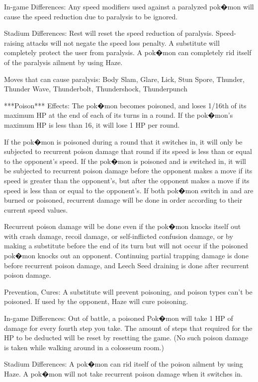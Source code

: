 \documentclass[reprint, aps, prl, paper=A4]{revtex4-1}
\begin{document}
In-game Differences: Any speed modifiers used against a paralyzed pok�mon will cause the speed
reduction due to paralysis to be ignored.

Stadium Differences: Rest will reset the speed reduction of paralysis. Speed-raising attacks
will not negate the speed loss penalty. A substitute will completely protect the user from
paralysis. A pok�mon can completely rid itself of the paralysis ailment by using Haze.

Moves that can cause paralysis: Body Slam, Glare, Lick, Stun Spore, Thunder, Thunder Wave,
          Thunderbolt, Thundershock, Thunderpunch


***Poison***
Effects: The pok�mon becomes poisoned, and loses 1/16th of its maximum HP at the end of each of
its turns in a round. If the pok�mon's maximum HP is less than 16, it will lose 1 HP per round.

If the pok�mon is poisoned during a round that it switches in, it will only be subjected to
recurrent poison damage that round if its speed is less than or equal to the opponent's speed.
If the pok�mon is poisoned and is switched in, it will be subjected to recurrent poison damage
before the opponent makes a move if its speed is greater than the opponent's, but after the
opponent makes a move if its speed is less than or equal to the opponent's. If both pok�mon
switch in and are burned or poisoned, recurrent damage will be done in order according to their
current speed values.

Recurrent poison damage will be done even if the pok�mon knocks itself out with crash damage,
recoil damage, or self-inflicted confusion damage, or by making a substitute before the end of
its turn but will not occur if the poisoned pok�mon knocks out an opponent. Continuing partial
trapping damage is done before recurrent poison damage, and Leech Seed draining is done after
recurrent poison damage.

Prevention, Cures: A substitute will prevent poisoning, and poison types can't be poisoned. If
used by the opponent, Haze will cure poisoning.

In-game Differences: Out of battle, a poisoned Pok�mon will take 1 HP of damage for every
fourth step you take. The amount of steps that required for the HP to be deducted will be reset
by resetting the game. (No such poison damage is taken while walking around in a colosseum
room.)

Stadium Differences: A pok�mon can rid itself of the poison ailment by using Haze. A pok�mon
will not take recurrent poison damage when it switches in.
\end{document}
